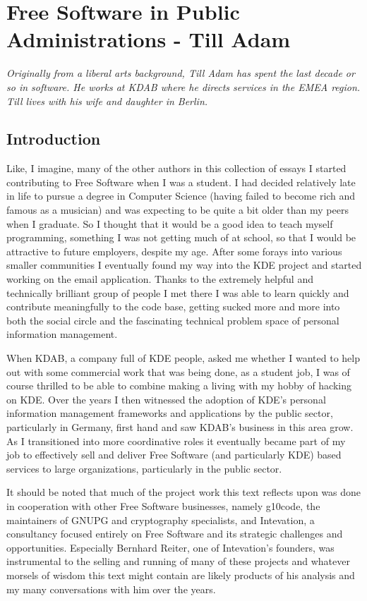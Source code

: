 \chapter{Free Software in Public Administrations - Till Adam}

\textit{Originally from a liberal arts background, Till Adam has spent the last
decade or so in software. He works at KDAB where he directs services in the EMEA
region. Till lives with his wife and daughter in Berlin.}


\section*{Introduction}

Like, I imagine, many of the other authors in this collection of essays I
started contributing to Free Software when I was a student. I had decided
relatively late in life to pursue a degree in Computer Science (having failed
to become rich and famous as a musician) and was expecting to be quite
a bit older than my peers when I graduate. So I thought that it would be a good
idea to teach myself programming, something I was not getting much of at
school, so that I would be attractive to future employers, despite my age.
After some forays into various smaller communities I eventually found my way
into the KDE project and started working on the email application. Thanks to
the extremely helpful and technically brilliant group of people I met there I
was able to learn quickly and contribute meaningfully to the code base, getting
sucked more and more into both the social circle and the fascinating technical
problem space of personal information management.

When KDAB, a company full of KDE people, asked me whether I wanted to help out
with some commercial work that was being done, as a student job, I was of
course thrilled to be able to combine making a living with my hobby of hacking
on KDE. Over the years I then witnessed the adoption of KDE's personal
information management frameworks and applications by the public sector,
particularly in Germany, first hand and saw KDAB's business in this area grow.
As I transitioned into more coordinative roles it eventually became part of my
job to effectively sell and deliver Free Software (and particularly KDE) based
services to large organizations, particularly in the public sector.

It should be noted that much of the project work this text reflects upon was done in
cooperation with other Free Software businesses, namely g10code, the
maintainers of GNUPG and cryptography specialists, and Intevation, a consultancy focused
entirely on Free Software and its strategic challenges and opportunities. Especially
Bernhard Reiter, one of Intevation's founders, was instrumental to the selling and
running of many of these projects and whatever morsels of wisdom this text might contain
are likely products of his analysis and my many conversations with him over the years.

